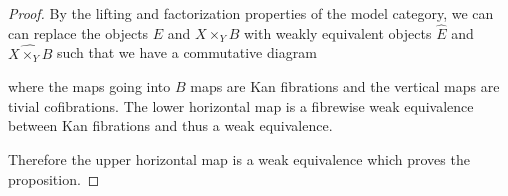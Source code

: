 \begin{prop}
\begin{proof}
        By the lifting and factorization properties of the model category, we can can replace the objects $E$ and $X\times_Y B$ with weakly equivalent objects $\widehat{E}$ and $\widehat{X\times_Y B}$ such that we have a commutative diagram
        \begin{center}
        \end{center} 
        where the maps going into $B$ maps are Kan fibrations and the vertical maps are tivial cofibrations.
        The lower horizontal map is a fibrewise weak equivalence between Kan fibrations and thus a weak equivalence.

        Therefore the upper horizontal map is a weak equivalence which proves the proposition.
    \end{proof}
\end{prop}